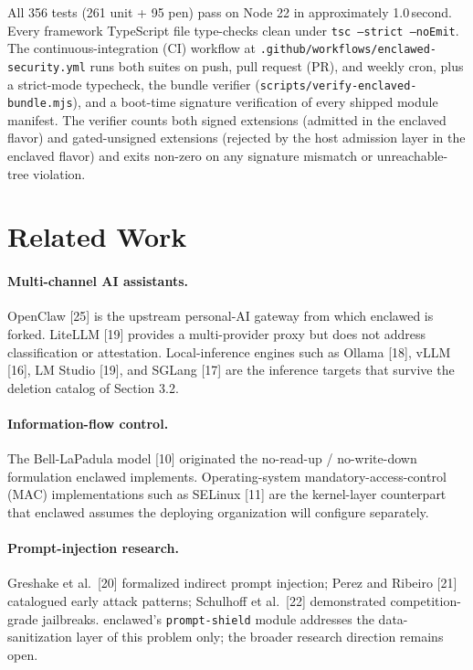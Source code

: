 \documentclass[11pt]{article}
\begin{document}
All 356 tests (261 unit + 95 pen) pass on Node 22 in approximately
1.0\,second. Every framework TypeScript file type-checks clean under
\texttt{tsc --strict --noEmit}. The continuous-integration (CI)
workflow at
\texttt{.github/workflows/enclawed-security.yml} runs both suites on
push, pull request (PR), and weekly cron, plus a strict-mode typecheck,
the bundle verifier
(\texttt{scripts/verify-enclaved-bundle.mjs}), and a boot-time
signature verification of every shipped module manifest. The verifier
counts both signed extensions (admitted in the enclaved flavor) and
gated-unsigned extensions (rejected by the host admission layer in
the enclaved flavor) and exits non-zero on any signature mismatch or
unreachable-tree violation.

\section{Related Work}

\paragraph{Multi-channel AI assistants.} OpenClaw [25] is the upstream
personal-AI gateway from which enclawed is forked. LiteLLM [19] provides
a multi-provider proxy but does not address classification or
attestation. Local-inference engines such as Ollama [18], vLLM [16],
LM Studio [19], and SGLang [17] are the inference targets that survive
the deletion catalog of Section 3.2.

\paragraph{Information-flow control.} The Bell-LaPadula model [10]
originated the no-read-up / no-write-down formulation enclawed
implements. Operating-system mandatory-access-control (MAC)
implementations such as SELinux [11] are the kernel-layer counterpart
that enclawed assumes the deploying organization will configure
separately.

\paragraph{Prompt-injection research.} Greshake et al.\ [20] formalized
indirect prompt injection; Perez and Ribeiro [21] catalogued early
attack patterns; Schulhoff et al.\ [22] demonstrated competition-grade
jailbreaks. enclawed's \texttt{prompt-shield} module addresses the
data-sanitization layer of this problem only; the broader research
direction remains open.
\end{document}
